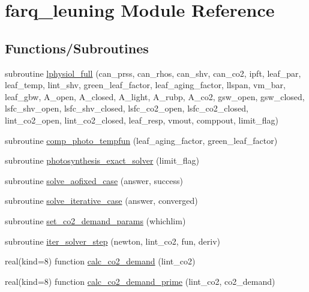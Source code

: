 \hypertarget{namespacefarq__leuning}{}\section{farq\+\_\+leuning Module Reference}
\label{namespacefarq__leuning}
\subsection*{Functions/\+Subroutines}
\begin{DoxyCompactItemize}
\item 
subroutine \hyperlink{namespacefarq__leuning_afaec87b2ad3c7bf6d33f9f778590317c}{lphysiol\+\_\+full} (can\+\_\+prss, can\+\_\+rhos, can\+\_\+shv, can\+\_\+co2, ipft, leaf\+\_\+par, leaf\+\_\+temp, lint\+\_\+shv, green\+\_\+leaf\+\_\+factor, leaf\+\_\+aging\+\_\+factor, llspan, vm\+\_\+bar, leaf\+\_\+gbw, A\+\_\+open, A\+\_\+closed, A\+\_\+light, A\+\_\+rubp, A\+\_\+co2, gsw\+\_\+open, gsw\+\_\+closed, lsfc\+\_\+shv\+\_\+open, lsfc\+\_\+shv\+\_\+closed, lsfc\+\_\+co2\+\_\+open, lsfc\+\_\+co2\+\_\+closed, lint\+\_\+co2\+\_\+open, lint\+\_\+co2\+\_\+closed, leaf\+\_\+resp, vmout, comppout, limit\+\_\+flag)
\item 
subroutine \hyperlink{namespacefarq__leuning_a9b3b89dd90573241f7a95685e0c416f6}{comp\+\_\+photo\+\_\+tempfun} (leaf\+\_\+aging\+\_\+factor, green\+\_\+leaf\+\_\+factor)
\item 
subroutine \hyperlink{namespacefarq__leuning_a874ab59c974d12da5a8ea01c48dd089c}{photosynthesis\+\_\+exact\+\_\+solver} (limit\+\_\+flag)
\item 
subroutine \hyperlink{namespacefarq__leuning_a8dbd2dbff6eba13ef68535d94a06a569}{solve\+\_\+aofixed\+\_\+case} (answer, success)
\item 
subroutine \hyperlink{namespacefarq__leuning_a88f53f468e321e185e87a1fa9f890116}{solve\+\_\+iterative\+\_\+case} (answer, converged)
\item 
subroutine \hyperlink{namespacefarq__leuning_a7a8d111e1aa61a24fdbd7e96f67967e0}{set\+\_\+co2\+\_\+demand\+\_\+params} (whichlim)
\item 
subroutine \hyperlink{namespacefarq__leuning_a0aaa5d6b54e5a9a9549d2c43bfbecf06}{iter\+\_\+solver\+\_\+step} (newton, lint\+\_\+co2, fun, deriv)
\item 
real(kind=8) function \hyperlink{namespacefarq__leuning_adcca2c24ca270f8fc0509c5e71906eff}{calc\+\_\+co2\+\_\+demand} (lint\+\_\+co2)
\item 
real(kind=8) function \hyperlink{namespacefarq__leuning_a4ea88f530f197b5a15c695c83e15e1a1}{calc\+\_\+co2\+\_\+demand\+\_\+prime} (lint\+\_\+co2, co2\+\_\+demand)

\end{DoxyCompactItemize}
